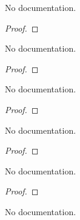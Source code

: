 \begin{theorem}\label{deriv_function_comp_segment}
        \leanok
                No documentation.
    \end{theorem}

\begin{proof}
    \leanok
\end{proof}

\begin{theorem}\label{HasFDeriv_Convergence}
        \leanok
                No documentation.
    \end{theorem}

\begin{proof}
    \leanok
\end{proof}

\begin{theorem}\label{Convergence_HasFDeriv}
        \leanok
                No documentation.
    \end{theorem}

\begin{proof}
    \leanok
\end{proof}

\begin{theorem}\label{HasFDeriv_iff_Convergence_Point}
        \leanok
                No documentation.
    \end{theorem}

\begin{proof}
    \leanok
\end{proof}

\begin{theorem}\label{HasFDeriv_iff_Convergence}
        \leanok
                No documentation.
    \end{theorem}

\begin{proof}
    \leanok
\end{proof}

\begin{theorem}\label{HasGradient_Convergence}
        \leanok
                No documentation.
    \end{theorem}

